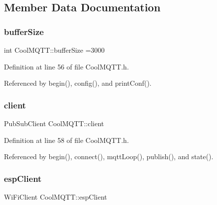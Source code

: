 \subsection{Member Data Documentation}
\mbox{\label{classCoolMQTT_a7f3cf26b51d6770f216e42c5ef13ca9f}} 
\subsubsection{\texorpdfstring{buffer\+Size}{bufferSize}}
{\footnotesize\ttfamily int Cool\+M\+Q\+T\+T\+::buffer\+Size =3000\hspace{0.3cm}{\ttfamily [private]}}



Definition at line 56 of file Cool\+M\+Q\+T\+T.\+h.



Referenced by begin(), config(), and print\+Conf().

\mbox{\label{classCoolMQTT_a4ca71e4f76ef868692a297efd45b1415}} 
\subsubsection{\texorpdfstring{client}{client}}
{\footnotesize\ttfamily Pub\+Sub\+Client Cool\+M\+Q\+T\+T\+::client\hspace{0.3cm}{\ttfamily [private]}}



Definition at line 58 of file Cool\+M\+Q\+T\+T.\+h.



Referenced by begin(), connect(), mqtt\+Loop(), publish(), and state().

\mbox{\label{classCoolMQTT_acc30a0200967374a524092a8a806502a}} 
\subsubsection{\texorpdfstring{esp\+Client}{espClient}}
{\footnotesize\ttfamily Wi\+Fi\+Client Cool\+M\+Q\+T\+T\+::esp\+Client\hspace{0.3cm}{\ttfamily [private]}}



